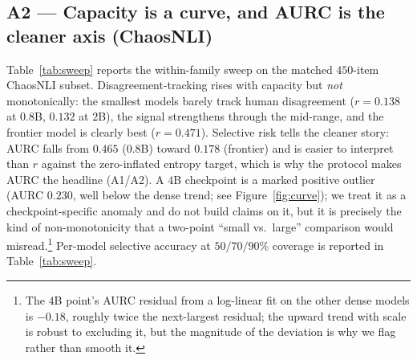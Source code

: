 \documentclass[letterpaper]{article} %
\begin{document}
\subsection{A2 --- Capacity is a curve, and AURC is the cleaner axis (ChaosNLI)}
Table~\ref{tab:sweep} reports the within-family sweep on the matched $450$-item
ChaosNLI subset. Disagreement-tracking rises with capacity but \emph{not}
monotonically: the smallest models barely track human disagreement
($r{=}0.138$ at $0.8$B, $0.132$ at $2$B), the signal strengthens through the
mid-range, and the frontier model is clearly best ($r{=}0.471$). Selective risk
tells the cleaner story: AURC falls from $0.465$ ($0.8$B) toward $0.178$ (frontier)
and is easier to interpret than $r$ against the zero-inflated entropy target,
which is why the protocol makes AURC the headline (A1/A2). A $4$B checkpoint is a
marked positive outlier (AURC $0.230$, well below the dense trend; see
Figure~\ref{fig:curve}); we treat it as a checkpoint-specific anomaly and do not
build claims on it, but it is precisely the kind of non-monotonicity that a
two-point ``small vs.\ large'' comparison would misread.\footnote{The $4$B point's
AURC residual from a log-linear fit on the other dense models is $-0.18$, roughly
twice the next-largest residual; the upward trend with scale is robust to
excluding it, but the magnitude of the deviation is why we flag rather than smooth
it.} Per-model selective accuracy at $50/70/90\%$ coverage is reported in
Table~\ref{tab:sweep}.
\end{document}
